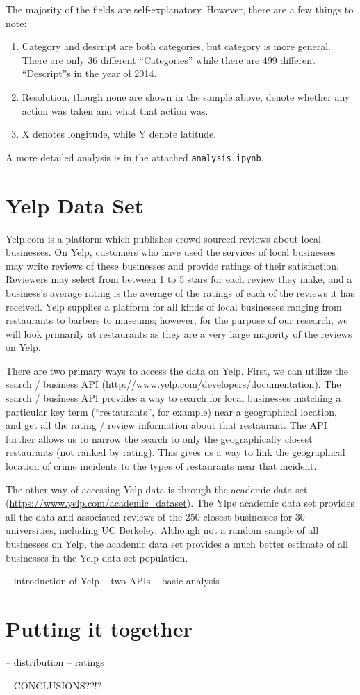 \documentclass{article}
\begin{document}
The majority of the fields are self-explanatory. However, there are a few
things to note:
\begin{enumerate}
\item Category and descript are both categories, but category is more
  general. There are only 36 different ``Categories'' while there are 499
  different ``Descript''s in the year of 2014.
\item Resolution, though none are shown in the sample above, denote whether
  any action was taken and what that action was.
\item X denotes longitude, while Y denote latitude.
\end{enumerate}

A more detailed analysis is in the attached \texttt{analysis.ipynb}.

\section{Yelp Data Set}

Yelp.com is a platform which publishes crowd-sourced reviews about local
businesses. On Yelp, customers who have used the services of local
businesses may write reviews of these businesses and provide ratings of
their satisfaction. Reviewers may select from between 1 to 5 stars for each
review they make, and a business's average rating is the average of the
ratings of each of the reviews it has received. Yelp supplies a platform
for all kinds of local businesses ranging from restaurants to barbers to
museums; however, for the purpose of our research, we will look primarily
at restaurants as they are a very large majority of the reviews on Yelp.

There are two primary ways to access the data on Yelp. First, we can
utilize the search / business API
(\url{http://www.yelp.com/developers/documentation}). The search / business
API provides a way to search for local businesses matching a particular key
term (``restaurants'', for example) near a geographical location, and get
all the rating / review information about that restaurant. The API further
allows us to narrow the search to only the geographically closest
restaurants (not ranked by rating). This gives us a way to link the
geographical location of crime incidents to the types of restaurants near
that incident.

The other way of accessing Yelp data is through the academic data set
(\url{https://www.yelp.com/academic_dataset}). The Ylpe academic data set
provides all the data and associated reviews of the 250 closest businesses
for 30 universities, including UC Berkeley. Although not a random sample of
all businesses on Yelp, the academic data set provides a much better
estimate of all businesses in the Yelp data set population.

-- introduction of Yelp
-- two APIs
-- basic analysis

\section{Putting it together}

-- distribution
-- ratings

-- CONCLUSIONS??!?
\end{document}
